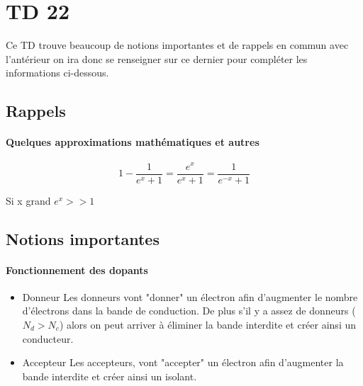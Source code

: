 \section{TD 22}



Ce TD trouve beaucoup de notions importantes et de rappels en commun avec l'antérieur on ira donc se renseigner sur ce dernier pour compléter les informations ci-dessous.


\subsection{Rappels}


\paragraph{Quelques approximations mathématiques et autres}

\[
	1-\frac{1}{e^x+1}=\frac{e^x}{e^x+1}=\frac{1}{e^{-x}+1}
\]

Si x grand $e^x>>1$


\subsection{Notions importantes}


\paragraph{Fonctionnement  des dopants}

\begin{itemize}[label=]

	\item Donneur
	Les donneurs vont "donner" un électron afin d'augmenter le nombre d'électrons dans la bande de conduction. De plus s'il y a assez de donneurs ($N_d>N_c$) alors on peut arriver à éliminer la bande interdite et créer ainsi un conducteur.
	
	\item Accepteur
	Les accepteurs, vont "accepter" un électron afin d'augmenter la bande interdite et créer ainsi un isolant.

\end{itemize}
